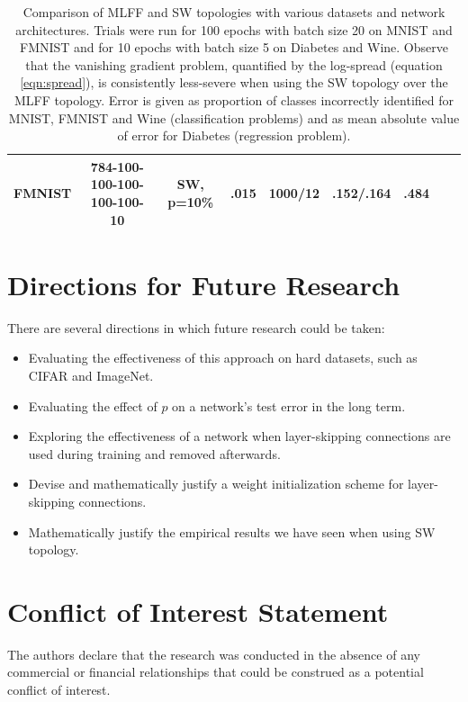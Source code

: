 \documentclass[utf8]{frontiersSCNS}
\begin{document}
\begin{table}
{\begin{tabular}{|c|c|c|c|c|c|c|c|c|}
 FMNIST & 784-100-100-100-100-100-10 & SW, p=10\% & .015 & 1000/12 & .152/.164 & \textbf{.484} \\\hline
\end{tabular}
}
\caption{Comparison of MLFF and SW topologies with various datasets and network architectures. Trials were run for 100 epochs with batch size 20 on MNIST and FMNIST and for 10 epochs with batch size 5 on Diabetes and Wine. Observe that the vanishing gradient problem, quantified by the log-spread (equation \ref{eqn:spread}), is consistently less-severe when using the SW topology over the MLFF topology. Error is given as proportion of classes incorrectly identified for MNIST, FMNIST and Wine (classification problems) and as mean absolute value of error for Diabetes (regression problem).}
\label{tbl:results}
\end{table}


\section{Directions for Future Research}

There are several directions in which future research could be taken:
\begin{itemize} 
\item Evaluating the effectiveness of this approach on hard datasets, such as CIFAR and ImageNet.
\item Evaluating the effect of $p$ on a network's test error in the long term.
\item Exploring the effectiveness of a network when layer-skipping connections are used during training and removed afterwards.
\item Devise and mathematically justify a weight initialization scheme for layer-skipping connections.
\item Mathematically justify the empirical results we have seen when using SW topology.
\end{itemize}

\section*{Conflict of Interest Statement}

The authors declare that the research was conducted in the absence of any commercial or financial relationships that could be construed as a potential conflict of interest.
\end{document}
